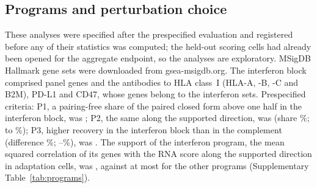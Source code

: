 \begin{table}[h]
\caption{\textbf{Recovered fraction of within-condition dependence (\%).} Held-out
targets: \PtGroups{} target-by-condition groups, 95\% intervals from 2,000
resamples of targets; conditions are cultured alone, with interferon-$\gamma$ and
with T cells. Non-targeting cells: three conditions pooled, intervals from 2,000
resamples of guide sets. Error, mean relative Frobenius error over held-out
groups against all scoring cells (independence, 1), inflated by scoring noise.
Controls are averages over ten draws.}
\label{tab:pert}
\centering\scriptsize\setlength{\tabcolsep}{3pt}

\end{table}

\subsection*{Programs and perturbation choice}
These analyses were
specified after the prespecified evaluation and registered before any of their statistics was computed; the
held-out scoring cells had already been opened for the aggregate endpoint, so the analyses are
exploratory. MSigDB Hallmark gene sets were downloaded from gsea-msigdb.org. The interferon block comprised \PgIfnGenes{}
panel genes and the antibodies to HLA class~I (HLA-A, -B, -C and B2M), PD-L1 and
CD47, whose genes belong to the interferon sets. Prespecified criteria: P1, a
pairing-free share of the paired closed form above one half in the interferon
block, was \PgPOne; P2, the same along the supported direction, was \PgPTwo{}
(share \PgAlongShare\%; \PgAlongShareLo{} to \PgAlongShareHi\%); P3, higher
recovery in the interferon block than in the complement (difference \PgDiff\%;
\PgDiffLo--\PgDiffHi\%), was \PgPThree. The support of the interferon program, the
mean squared correlation of its genes with the RNA score along the supported
direction in adaptation cells, was \PgSupportIfn, against at most
\PgSupportOtherMax{} for the \PgOtherCount{} other programs (Supplementary
Table~\ref{tab:programs}).

